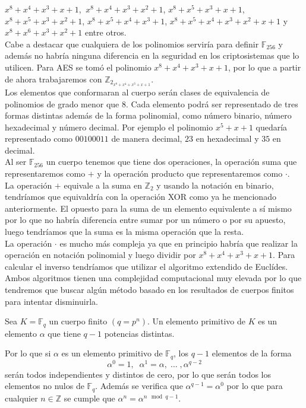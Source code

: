 $x^8+x^4+x^3+x+1$, $\:x^8+x^4+x^3+x^2+1$, $x^8+x^5+x^3+x+1$, $x^8+x^5+x^3+x^2+1$, $x^8+x^5+x^4+x^3+1$, $x^8+x^5+x^4+x^3+x^2+x+1$ y $x^8+x^6+x^3+x^2+1$ entre otros.\\ 
Cabe a destacar que cualquiera de los polinomios serviría para definir $\mathbb{F}_{256}$ y además no habría ninguna diferencia en la seguridad en los criptosistemas que lo utilicen. Para AES se tomó el polinomio $x^8+x^4+x^3+x+1$, por lo que a partir de ahora trabajaremos con $\mathbb{Z}_{2_{x^8+x^4+x^3+x+1}}$.\\
Los elementos que conformaran al cuerpo serán clases de equivalencia de polinomios  de grado menor que 8. Cada elemento podrá ser representado de tres formas distintas además de la forma polinomial, como número binario, número hexadecimal y número decimal. Por ejemplo el polinomio $x^5+x+1$ quedaría representado como $00100011$ de manera decimal, $23$ en hexadecimal y $35$ en decimal.\\
Al ser $\mathbb{F}_{256}$ un cuerpo tenemos que tiene dos operaciones, la operación suma que representaremos como $+$ y la operación producto que representaremos como $\cdot$.\\
La operación $+$ equivale a la suma en $\mathbb{Z}_2$ y usando la notación en binario, tendríamos que equivaldría con la operación XOR como ya he mencionado anteriormente. El opuesto para la suma de un elemento equivalente a sí mismo por lo que no habría diferencia entre sumar por un número o por su apuesto, luego tendríamos que la suma es la misma operación que la resta.\\
La operación $\cdot$  es mucho más compleja ya que en principio habría que realizar la operación en notación polinomial y luego dividir por $x^8+x^4+x^3+x+1$. Para calcular el inverso tendríamos que utilizar el algoritmo extendido de Euclídes. Ambos algoritmos tienen una complejidad computacional muy elevada por lo que tendremos que buscar algún método basado en los resultados de cuerpos finitos para intentar disminuirla.\\
\begin{definicion}
	Sea $K=\mathbb{F}_q$ un cuerpo finito $(q=p^n)$. Un elemento primitivo de $K$ es un elemento $\alpha$ que tiene $q-1$ potencias distintas.
\end{definicion}
Por lo que si $\alpha$ es un elemento primitivo de $\mathbb{F}_q$, los $q-1$ elementos de la forma\\
$$
	\alpha^0=1,\;\; \alpha^1=\alpha,\;\dots\; ,\alpha^{q-2}
$$
serán todos independientes y distintos de cero, por lo que serán todos los elementos no nulos de $\mathbb{F}_q$. Además se verifica que $\alpha^{q-1}=\alpha^0$ por lo que para cualquier $n \in \mathbb{Z}$ se cumple que $\alpha^n=\alpha^{n\mod q-1}$.\\


